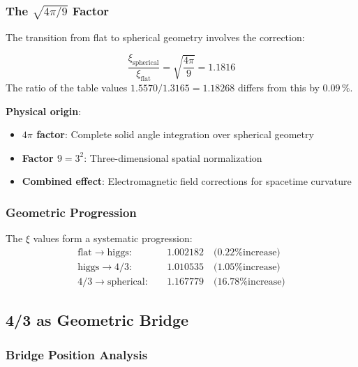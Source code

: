 	\subsubsection[The Square Root Factor]{The $\sqrt{4\pi/9}$ Factor}
	\label{subsubsec:correction_factor}
	
	The transition from flat to spherical geometry involves the correction:
	
	\begin{equation}
		\frac{\xi_{\text{spherical}}}{\xi_{\text{flat}}} = \sqrt{\frac{4\pi}{9}} = 1.1816
		\label{eq:em_correction}
	\end{equation}
	The ratio of the table values $1.5570/1.3165=1.18268$ differs from this by $0.09\,\%$.
	
	\textbf{Physical origin}:
	\begin{itemize}
		\item \textbf{$4\pi$ factor}: Complete solid angle integration over spherical geometry
		\item \textbf{Factor $9 = 3^2$}: Three-dimensional spatial normalization
		\item \textbf{Combined effect}: Electromagnetic field corrections for spacetime curvature
	\end{itemize}
	
	\subsubsection{Geometric Progression}
	\label{subsubsec:geometric_progression}
	
	The $\xi$ values form a systematic progression:
	\begin{align}
		\text{flat} \to \text{higgs}: \quad &1.002182 \quad \text{(0.22\% increase)} \\
		\text{higgs} \to \text{4/3}: \quad &1.010535 \quad \text{(1.05\% increase)} \\
		\text{4/3} \to \text{spherical}: \quad &1.167779 \quad \text{(16.78\% increase)}
	\end{align}
	
	\subsection{4/3 as Geometric Bridge}
	\label{subsec:four_thirds_bridge}
	
	\subsubsection{Bridge Position Analysis}
	\label{subsubsec:bridge_position}
	
